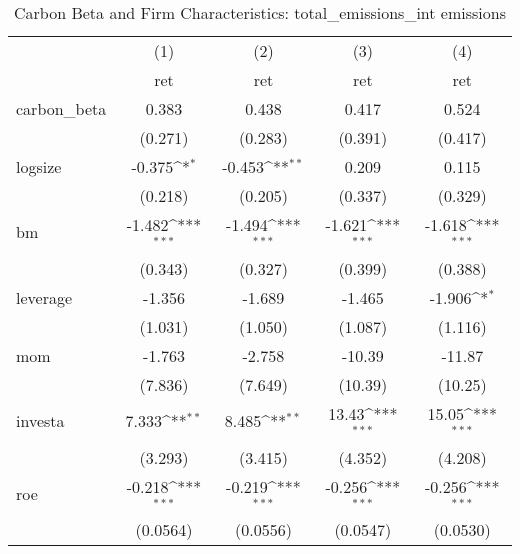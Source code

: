 \begin{table}[htbp]\centering
\def\sym#1{\ifmmode^{#1}\else\(^{#1}\)\fi}
\caption{Carbon Beta and Firm Characteristics: total\_emissions\_int emissions}
\begin{tabular}{l*{4}{c}}
\hline\hline
                    &\multicolumn{1}{c}{(1)}&\multicolumn{1}{c}{(2)}&\multicolumn{1}{c}{(3)}&\multicolumn{1}{c}{(4)}\\
                    &\multicolumn{1}{c}{ret}&\multicolumn{1}{c}{ret}&\multicolumn{1}{c}{ret}&\multicolumn{1}{c}{ret}\\
\hline
carbon\_beta         &       0.383         &       0.438         &       0.417         &       0.524         \\
                    &     (0.271)         &     (0.283)         &     (0.391)         &     (0.417)         \\
[1em]
logsize             &      -0.375\sym{*}  &      -0.453\sym{**} &       0.209         &       0.115         \\
                    &     (0.218)         &     (0.205)         &     (0.337)         &     (0.329)         \\
[1em]
bm                  &      -1.482\sym{***}&      -1.494\sym{***}&      -1.621\sym{***}&      -1.618\sym{***}\\
                    &     (0.343)         &     (0.327)         &     (0.399)         &     (0.388)         \\
[1em]
leverage            &      -1.356         &      -1.689         &      -1.465         &      -1.906\sym{*}  \\
                    &     (1.031)         &     (1.050)         &     (1.087)         &     (1.116)         \\
[1em]
mom                 &      -1.763         &      -2.758         &      -10.39         &      -11.87         \\
                    &     (7.836)         &     (7.649)         &     (10.39)         &     (10.25)         \\
[1em]
investa             &       7.333\sym{**} &       8.485\sym{**} &       13.43\sym{***}&       15.05\sym{***}\\
                    &     (3.293)         &     (3.415)         &     (4.352)         &     (4.208)         \\
[1em]
roe                 &      -0.218\sym{***}&      -0.219\sym{***}&      -0.256\sym{***}&      -0.256\sym{***}\\
                    &    (0.0564)         &    (0.0556)         &    (0.0547)         &    (0.0530)         \\

\end{tabular}
\end{table}
